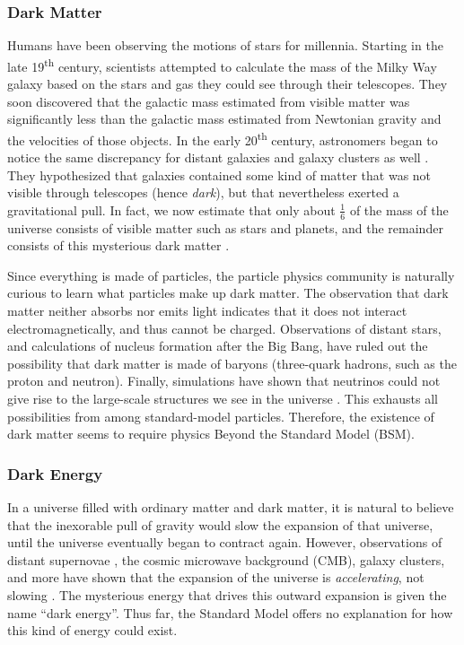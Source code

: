 \subsubsection*{Dark Matter}
Humans have been observing the motions of stars
for millennia. Starting in the late 19\textsuperscript{th}
century, scientists attempted to calculate the mass of the Milky Way
galaxy based on the stars and gas they could see through their
telescopes. They soon discovered that the galactic mass estimated from
visible matter was significantly less than the galactic mass
estimated from Newtonian gravity and the velocities of those objects. In the early
20\textsuperscript{th} century, astronomers began to notice the same
discrepancy for distant galaxies and galaxy clusters as well \cite{dmhistory}.
They hypothesized that galaxies contained some kind of
matter that was not visible through telescopes (hence \emph{dark}),
but that nevertheless exerted a gravitational pull.
In fact, we now estimate that only about $\frac{1}{6}$ of the
mass of the universe consists of visible matter such as stars
and planets, and the remainder consists of this mysterious dark matter
\cite{planck2013}.

Since everything is made of particles, the particle physics community
is naturally curious to learn what particles make up dark matter.
The observation that dark matter neither absorbs nor emits light
indicates that it does not interact electromagnetically, and thus
cannot be charged. Observations of distant stars, and calculations of
nucleus formation after the Big Bang, have ruled out the possibility
that dark matter is made of baryons (three-quark hadrons,
such as the proton and neutron). Finally, simulations have shown
that neutrinos could not give rise to the large-scale structures
we see in the universe \cite{dmhistory}.
This exhausts all possibilities from among standard-model particles.
Therefore, the existence of dark matter seems to require
physics Beyond the Standard Model (BSM).

\subsubsection*{Dark Energy}
In a universe filled with ordinary matter and dark matter, it is
natural to believe that the inexorable pull of gravity would
slow the expansion of that universe, until the universe eventually began to
contract again. However, observations of distant supernovae \cite{supercosmo,highz},
the cosmic microwave background (CMB), galaxy clusters, and more have shown that
the expansion of the universe is \emph{accelerating}, not slowing
\cite{darkenergy}. The mysterious energy that drives this outward expansion
is given the name ``dark energy''. Thus far, the Standard Model offers no
explanation for how this kind of energy could exist.

